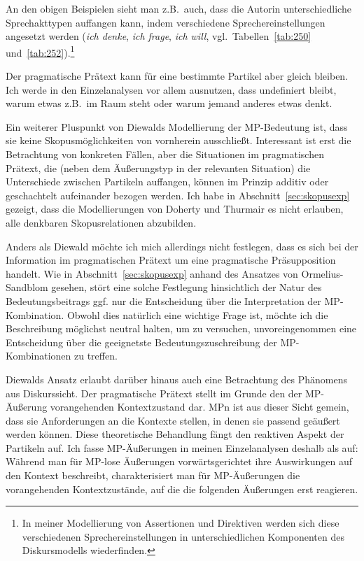 An den obigen Beispielen sieht man z.B.\ auch, dass die Autorin unterschiedliche Sprechakttypen  auffangen kann, indem verschiedene Sprechereinstellungen  angesetzt werden (\textit{ich denke}, \textit{ich frage}, \textit{ich will}, vgl.\ Tabellen~\ref{tab:250} und~\ref{tab:252}).\footnote{In meiner Modellierung von Assertionen und Direktiven werden sich diese verschiedenen Sprechereinstellungen in unterschiedlichen Komponenten des Diskursmodells wiederfinden.}

Der pragmatische Prätext  kann für eine bestimmte Partikel aber gleich bleiben. Ich werde in den Einzelanalysen vor allem ausnutzen, dass undefiniert bleibt, warum etwas z.B.\ im Raum steht oder warum jemand anderes etwas denkt.

Ein weiterer Pluspunkt von Diewalds Modellierung der MP-Bedeutung ist, dass sie keine Skopusmöglichkeiten von vornherein ausschließt. Interessant ist erst die Betrachtung von konkreten Fällen, aber die Situationen im pragmatischen Prätext, die (neben dem Äußerungstyp in der relevanten Situation) die Unterschiede zwischen Partikeln auffangen, können im Prinzip additiv oder geschach\-telt aufeinander bezogen werden. Ich habe in Abschnitt~\ref{sec:skopusexp} gezeigt, dass die Model\-lierungen von Doherty und Thurmair es nicht erlauben, alle denkbaren Skopusrelationen abzubilden.

Anders als Diewald möchte ich mich allerdings nicht festlegen, dass es sich bei der Information im pragmatischen Prätext um eine pragmatische Präsupposition  handelt. Wie in Abschnitt~\ref{sec:skopusexp} anhand des Ansatzes von Ormelius-Sandblom gesehen, stört eine solche Festlegung hinsichtlich der Natur des Bedeutungsbeitrags ggf. nur die Entscheidung über die Interpretation der MP-Kombination. Obwohl dies natürlich eine wichtige Frage ist, möchte ich die Beschreibung mög\-lichst neutral halten, um zu versuchen, unvoreingenommen eine Entscheidung über die geeignetste Bedeutungszuschreibung der MP-Kom\-bi\-na\-ti\-on\-en zu treffen. 

Diewalds Ansatz erlaubt darüber hinaus auch eine Betrachtung des Phänomens aus Diskurssicht. Der pragmatische Prätext stellt im Grunde den der MP-Äuße\-rung vorangehenden Kontextzustand dar. MPn ist aus dieser Sicht gemein, dass sie Anforderungen an die Kontexte stellen, in denen sie passend geäußert werden können. Diese theoretische Behandlung fängt den reaktiven Aspekt der Partikeln auf. Ich fasse MP-Äußerungen in meinen Einzelanalysen deshalb als  auf: Während man für MP-lose Äußerungen vorwärtsgerichtet ihre Auswirkungen auf den Kontext beschreibt, charakte\-risiert man für MP-Äußerungen die vorangehenden Kontextzustände, auf die die folgenden Äußerungen erst reagieren. 


